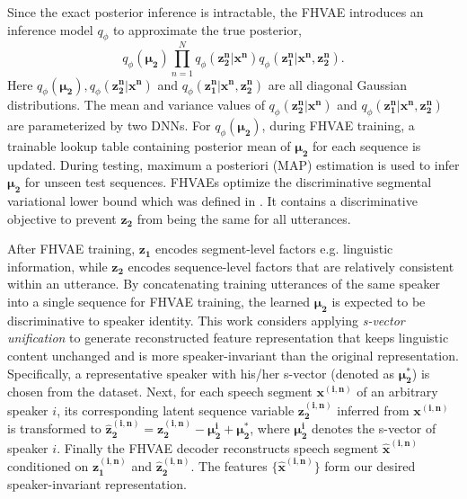 \documentclass[a4paper]{article}
\begin{document}
Since the exact posterior inference is intractable,  the FHVAE introduces an inference model $q_{\phi}$
to approximate the true posterior,
\begin{equation}
   q_{\phi} (\bm{\mu_2})\prod_{n=1}^{N}q_{\phi} (\bm{z_2^n}| \bm{x^n}) q_{\phi}(\bm{z_1^n}|\bm{x^n}, \bm{z_2^n}).
   \label{eqt:inference}
\end{equation}
Here  $q_{\phi} (\bm{\mu_2}), q_{\phi} (\bm{z_2^n}| \bm{x^n})$ and $q_{\phi}(\bm{z_1^n}|\bm{x^n}, \bm{z_2^n})$ are all diagonal Gaussian distributions. The mean and variance values of $q_{\phi} (\bm{z_2^n}| \bm{x^n})$ and $q_{\phi}(\bm{z_1^n}|\bm{x^n}, \bm{z_2^n})$ are parameterized by two DNNs. For $q_{\phi} (\bm{\mu_2})$, during FHVAE training, a trainable lookup table containing posterior mean of $\bm{\mu_2}$ for each sequence is updated. During testing, maximum a posteriori (MAP) estimation is used to infer  $\bm{\mu_2}$ for unseen test sequences.
FHVAEs optimize the discriminative segmental variational lower bound which was defined in \cite{hsu2017nips}. It contains a  discriminative objective to prevent $\bm{z_2}$ from being the same for all utterances.

After FHVAE training, $\bm{z_1}$ encodes segment-level factors e.g. linguistic information, while $\bm{z_2}$ encodes sequence-level factors that are relatively consistent within an utterance. By concatenating training utterances of the same speaker into a single sequence for FHVAE training, the learned  
 $\bm{\mu_2}$ is expected to be discriminative to speaker identity.
This work considers applying \textit{s-vector unification} \cite{Feng2019improving_arxiv} to generate reconstructed feature representation that keeps linguistic content unchanged and is more speaker-invariant than the original representation.
Specifically, a representative speaker with his/her s-vector (denoted as $\bm{\mu_2^*}$) is chosen from the dataset. Next, for each speech segment $\bm{x^{(i,n)}}$ of an arbitrary speaker $i$, its corresponding latent sequence variable $\bm{z_2^{(i,n)}}$ inferred from $\bm{x^{(i,n)}}$ is transformed to $\bm{\hat{z}_2^{(i,n)}}=\bm{z_2^{(i,n)}}-\bm{\mu_2^i}+\bm{\mu_2^*}$, where $\bm{\mu_2^i}$ denotes the s-vector of speaker $i$. 
Finally the FHVAE decoder reconstructs speech segment $\bm{\hat{x}^{(i,n)}}$ conditioned on $\bm{z_1^{(i,n)}}$ and $ \bm{\hat{z}_2^{(i,n)}}$. The features $\{\bm{\hat{x}^{(i,n)}}\}$ form our desired speaker-invariant representation.
\end{document}
